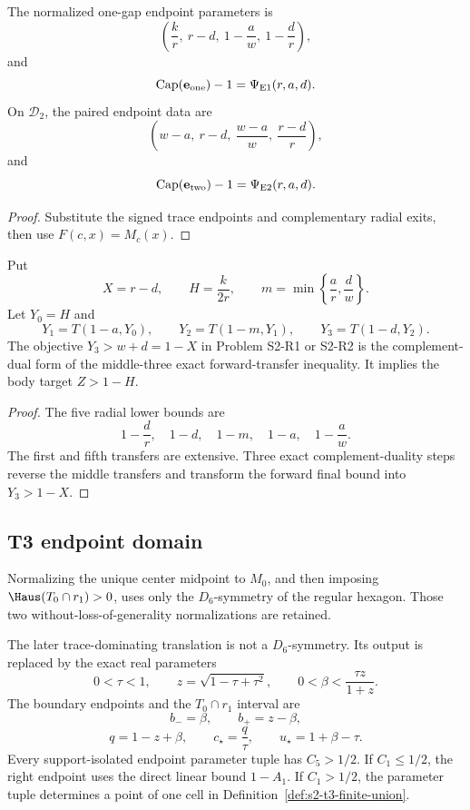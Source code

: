\begin{proposition}
\label{prop:s2-endpoint-bridge}
The normalized one-gap endpoint parameters is
\[
 \left(\frac{k}{r},\ r-d,\ 1-\frac a w,\ 1-\frac d r\right),
\]
and
\[
 \mathrm{Cap}(\mathbf e_{\rm one})-1
 =\Psi_{\rm E1}(r,a,d).
\]
On \(\mathcal D_2\), the paired endpoint data are
\[
 \left(w-a,\ r-d,\ \frac{w-a}{w},\ \frac{r-d}{r}\right),
\]
and
\[
 \mathrm{Cap}(\mathbf e_{\rm two})-1
 =\Psi_{\rm E2}(r,a,d).
\]
\end{proposition}

\begin{proof}
Substitute the signed trace endpoints and complementary radial exits, then use
\(F(c,x)=M_c(x)\).
\end{proof}

\begin{proposition}
\label{prop:s2-return-bridge}
Put
\[
 X=r-d,\qquad H=\frac{k}{2r},\qquad
 m=\min\left\{\frac ar,\frac dw\right\}.
\]
Let \(Y_0=H\) and
\[
 Y_1=T(1-a,Y_0),\qquad
 Y_2=T(1-m,Y_1),\qquad
 Y_3=T(1-d,Y_2).
\]
The objective \(Y_3>w+d=1-X\) in Problem S2-R1 or S2-R2 is the
complement-dual form of the middle-three exact forward-transfer inequality.
It implies the body target \(Z>1-H\).
\end{proposition}

\begin{proof}
The five radial lower bounds are
\[
 1-\frac dr,\quad 1-d,\quad 1-m,\quad 1-a,\quad 1-\frac aw.
\]
The first and fifth transfers are extensive.  Three exact complement-duality
steps reverse the middle transfers and transform the forward final bound
into \(Y_3>1-X\).
\end{proof}

\subsection{T3 endpoint domain}

\begin{proposition}
\label{prop:s2-t3-source-bridge}
Normalizing the unique center midpoint to \(M_0\), and then imposing
\(\Haus(T_0\cap r_1)>0\), uses only the \(D_6\)-symmetry of the regular
hexagon.  Those two without-loss-of-generality normalizations are retained.

The later trace-dominating translation is not a \(D_6\)-symmetry.  Its output
is replaced by the exact real parameters
\[
 0<\tau<1,\qquad
 z=\sqrt{1-\tau+\tau^2},\qquad
 0<\beta<\frac{\tau z}{1+z}.
\]
The boundary endpoints and the $T_0\cap r_1$ interval are
\[
 b_-=\beta,\qquad b_+=z-\beta,
\]
\[
 q=1-z+\beta,\qquad
 c_\star=\frac q\tau,\qquad
 u_\star=1+\beta-\tau.
\]
Every support-isolated endpoint parameter tuple has $C_5>1/2$.  If
$C_1\le1/2$, the right endpoint uses the direct linear bound $1-A_1$.  If
$C_1>1/2$, the parameter tuple determines a point of one cell in
Definition~\ref{def:s2-t3-finite-union}.
\end{proposition}

